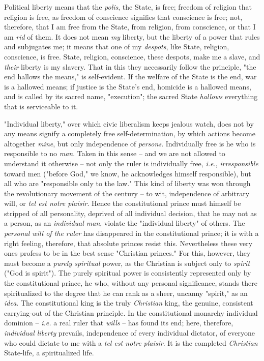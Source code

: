 Political liberty means that the \textit{polis}, the State, is free; freedom 
of religion that religion is free, as freedom of conscience signifies that 
conscience is free; not, therefore, that I am free from the State, from 
religion, from conscience, or that I am \textit{rid} of them. It does not mean 
\textit{my} liberty, but the liberty of a power that rules and subjugates me; 
it means that one of my \textit{despots}, like State, religion, conscience, is 
free. State, religion, conscience, these despots, make me a slave, and 
\textit{their} liberty is my slavery. That in this they necessarily follow the 
principle, "{}the end hallows the means,"{} is self-evident. If the welfare of 
the State is the end, war is a hallowed means; if justice is the State's end, 
homicide is a hallowed means, and is called by its sacred name, 
"{}execution"{}; the sacred State \textit{hallows} everything that is 
serviceable to it.

"{}Individual liberty,"{} over which civic liberalism keeps jealous watch, 
does not by any means signify a completely free self-determination, by which 
actions become altogether \textit{mine}, but only independence of 
\textit{persons}. Individually free is he who is responsible to no 
\textit{man}. Taken in this sense -- and we are not allowed to understand it 
otherwise -- not only the ruler is individually free, \textit{i.e.}, 
\textit{irresponsible} toward men ("{}before God,"{} we know, he acknowledges 
himself responsible), but all who are "{}responsible only to the law."{} This 
kind of liberty was won through the revolutionary movement of the century -- 
to wit, independence of arbitrary will, or \textit{tel est notre plaisir}. 
Hence the constitutional prince must himself be stripped of all personality, 
deprived of all individual decision, that he may not as a person, as an 
\textit{individual man}, violate the "{}individual liberty"{} of others. The 
\textit{personal will of the ruler} has disappeared in the constitutional 
prince; it is with a right feeling, therefore, that absolute princes resist 
this. Nevertheless these very ones profess to be in the best sense 
"{}Christian princes."{} For this, however, they must become a \textit{purely 
spiritual} power, as the Christian is subject only to \textit{spirit} ("{}God 
is spirit"{}). The purely spiritual power is consistently represented only by 
the constitutional prince, he who, without any personal significance, stands 
there spiritualized to the degree that he can rank as a sheer, uncanny 
"{}spirit,"{} as an \textit{idea}. The constitutional king is the truly 
\textit{Christian} king, the genuine, consistent carrying-out of the Christian 
principle. In the constitutional monarchy individual dominion -- \textit{i.e.} 
a real ruler that \textit{wills} -- has found its end; here, therefore, 
\textit{individual liberty} prevails, independence of every individual 
dictator, of everyone who could dictate to me with a \textit{tel est notre 
plaisir}. It is the completed \textit{Christian} State-life, a spiritualized 
life.


